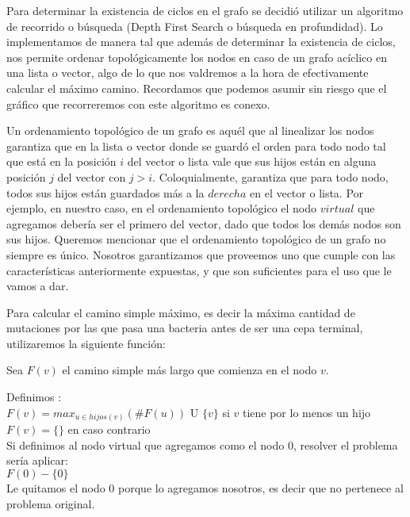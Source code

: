 \quad Para determinar la existencia de ciclos en el grafo se decidió utilizar un algoritmo de recorrido o búsqueda  (Depth First Search o búsqueda en profundidad). Lo implementamos de manera tal que además de determinar la existencia de ciclos, nos permite ordenar topológicamente los nodos en caso de un grafo acíclico en una lista o vector, algo de lo que nos valdremos a la hora de efectivamente calcular el máximo camino. Recordamos que podemos asumir sin riesgo que el gráfico que recorreremos con este algoritmo es conexo.

\quad Un ordenamiento topológico de un grafo es aquél que al linealizar los nodos garantiza que en la lista o vector donde se guardó el orden para todo nodo tal que está en la posición $i$ del vector o lista vale que sus hijos están en alguna posición $j$ del vector con $j>i$. Coloquialmente, garantiza que para todo nodo, todos sus hijos están guardados más a la $derecha$ en el vector o lista. Por ejemplo, en nuestro caso, en el ordenamiento topológico el nodo $virtual$ que agregamos debería ser el primero del vector, dado que todos los demás nodos son sus hijos. Queremos mencionar que el ordenamiento topológico de un grafo no siempre es único. Nosotros garantizamos que proveemos uno que cumple con las características anteriormente expuestas, y que son suficientes para el uso que le vamos a dar.


\quad Para calcular el camino simple máximo, es decir la máxima cantidad de mutaciones por las que pasa una bacteria antes de ser una cepa terminal, utilizaremos la siguiente función:

\quad Sea $F(v)$ el camino simple más largo que comienza en el nodo $v$.

\quad Definimos :\\	

\indent $F(v)= max_{u \in hijos(v)} (\#F(u))$ U $\{v\}$  \indent \indent si $v$ tiene por lo menos un hijo\\
\indent  $F(v)=\{\}$ \indent \indent \indent \indent \indent \indent \indent \indent  en caso contrario\\

\indent  Si definimos al nodo virtual que agregamos como el nodo 0, resolver el problema sería aplicar:\\

\indent $F(0) - \{0\}$\\

\indent Le quitamos el nodo 0 porque lo agregamos nosotros, es decir que no pertenece al problema original.





